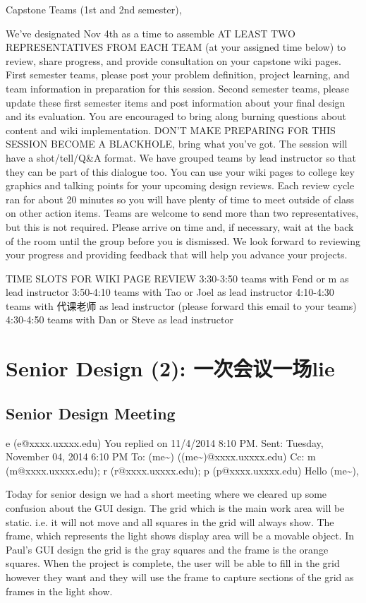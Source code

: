 \documentclass[12pt]{book}
\begin{document}
Capstone Teams (1st and 2nd semester),

We've designated Nov 4th as a time to assemble AT LEAST TWO REPRESENTATIVES FROM EACH TEAM (at your assigned time below) to review, share progress, and provide consultation on your capstone wiki pages.  First semester teams, please post your problem definition, project learning, and team information in preparation for this session.  Second semester teams, please update these first semester items and post information about your final design and its evaluation.  You are encouraged to bring along burning questions about content and wiki implementation.  DON'T MAKE PREPARING FOR THIS SESSION BECOME A BLACKHOLE, bring what you've got.  The session will have a shot/tell/Q\&A format.  We have grouped teams by lead instructor so that they can be part of this dialogue too.  You can use your wiki pages to college key graphics and talking points for your upcoming design reviews.  Each review cycle ran for about 20 minutes so you will have plenty of time to meet outside of class on other action items.  Teams are welcome to send more than two representatives, but this is not required.  Please arrive on time and, if necessary, wait at the back of the room until the group before you is dismissed.  We look forward to reviewing your progress and providing feedback that will help you advance your projects.

TIME SLOTS FOR WIKI PAGE REVIEW
3:30-3:50 teams with Fend or m as lead instructor
3:50-4:10 teams with Tao or Joel as lead instructor
4:10-4:30 teams with 代课老师 as lead instructor (please forward this email to your teams)
4:30-4:50 teams with Dan or Steve as lead instructor

\section{Senior Design (2): 一次会议一场lie}
\label{sec-18-2}
\subsection{Senior Design Meeting}
\label{sec-18-2-1}
e (e@xxxx.uxxxx.edu)
You replied on 11/4/2014 8:10 PM.
Sent:        Tuesday, November 04, 2014 6:10 PM
To:        
(me\textasciitilde{}) ((me\textasciitilde{})@xxxx.uxxxx.edu)
Cc:        
m (m@xxxx.uxxxx.edu); r (r@xxxx.uxxxx.edu); p (p@xxxx.uxxxx.edu)
Hello (me\textasciitilde{}),

Today for senior design we had a short meeting where we cleared up some confusion about the GUI design. The grid which is the main work area will be static. i.e. it will not move and all squares in the grid will always show. The frame, which represents the light shows display area will be a movable object. In Paul's GUI design the grid is the gray squares and the frame is the orange squares. When the project is complete, the user will be able to fill in the grid however they want and they will use the frame to capture sections of the grid as frames in the light show.  
\end{document}
